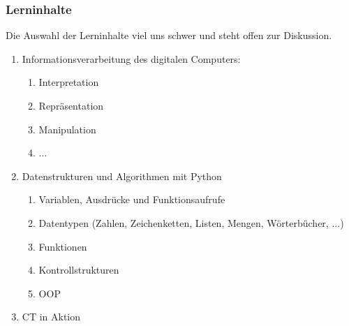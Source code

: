 \documentclass[german,aspectratio=169]{beamer}
\begin{document}

\begin{frame}
	\frametitle{Lerninhalte}
	Die Auswahl der Lerninhalte viel uns schwer und steht offen zur Diskussion.
	\begin{enumerate}[label=(\arabic*)]
		\item Informationsverarbeitung des digitalen Computers: 
		\begin{enumerate}[label=$\bullet$]
			\item Interpretation
			\item Repräsentation
			\item Manipulation
			\item $\ldots$
		\end{enumerate}
		\item Datenstrukturen und Algorithmen mit Python
			\begin{enumerate}[label=$\bullet$]
			\item Variablen, Ausdrücke und Funktionsaufrufe
			\item Datentypen (Zahlen, Zeichenketten, Listen, Mengen, Wörterbücher, $\ldots$)
			\item Funktionen
			\item Kontrollstrukturen
			\item OOP
		\end{enumerate}
		\item CT in Aktion
	\end{enumerate}
\end{frame}
\end{document}
